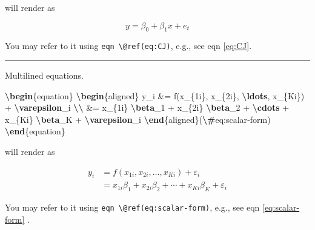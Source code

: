 \documentclass[
]{book}
\newenvironment{Shaded}{\begin{snugshade}}{\end{snugshade}}
\newcommand{\ExtensionTok}[1]{#1}
\newcommand{\KeywordTok}[1]{\textcolor[rgb]{0.13,0.29,0.53}{\textbf{#1}}}
\newcommand{\NormalTok}[1]{#1}
\newcommand{\SpecialCharTok}[1]{\textcolor[rgb]{0.81,0.36,0.00}{\textbf{#1}}}
\newcommand{\SpecialStringTok}[1]{\textcolor[rgb]{0.31,0.60,0.02}{#1}}
\theoremstyle{definition}
\theoremstyle{definition}
\theoremstyle{definition}
\theoremstyle{definition}
\theoremstyle{remark}
\begin{document}
will render as

\begin{equation} 
y=\beta_0 + \beta_1x + e_t
\label{eq:CJ}
\end{equation}

You may refer to it using \texttt{eqn\ \textbackslash{}@ref(eq:CJ)}, e.g., see eqn \eqref{eq:CJ}.

\begin{center}\rule{0.5\linewidth}{0.5pt}\end{center}

\begin{Shaded}
\begin{Highlighting}[]
\NormalTok{Multilined equations.}
  
\KeywordTok{\textbackslash{}begin}\NormalTok{\{}\ExtensionTok{equation}\NormalTok{\}}\SpecialStringTok{ }
\KeywordTok{\textbackslash{}begin}\NormalTok{\{}\ExtensionTok{aligned}\NormalTok{\}}
\SpecialStringTok{y\_i \&= f(x\_\{1i\}, x\_\{2i\}, }\SpecialCharTok{\textbackslash{}ldots}\SpecialStringTok{, x\_\{Ki\}) + }\SpecialCharTok{\textbackslash{}varepsilon}\SpecialStringTok{\_i }\SpecialCharTok{\textbackslash{}\textbackslash{}}
\SpecialStringTok{\&= x\_\{1i\} }\SpecialCharTok{\textbackslash{}beta}\SpecialStringTok{\_1 + x\_\{2i\} }\SpecialCharTok{\textbackslash{}beta}\SpecialStringTok{\_2 + }\SpecialCharTok{\textbackslash{}cdots}\SpecialStringTok{ + x\_\{Ki\} }\SpecialCharTok{\textbackslash{}beta}\SpecialStringTok{\_K + }\SpecialCharTok{\textbackslash{}varepsilon}\SpecialStringTok{\_i}
\KeywordTok{\textbackslash{}end}\NormalTok{\{}\ExtensionTok{aligned}\NormalTok{\}}\SpecialStringTok{(}\SpecialCharTok{\textbackslash{}\#}\SpecialStringTok{eq:scalar{-}form)}
\KeywordTok{\textbackslash{}end}\NormalTok{\{}\ExtensionTok{equation}\NormalTok{\}}
\end{Highlighting}
\end{Shaded}

will render as

\begin{equation} 
\begin{aligned}
y_i &= f(x_{1i}, x_{2i}, \ldots, x_{Ki}) + \varepsilon_i \\
&= x_{1i} \beta_1 + x_{2i} \beta_2 + \cdots + x_{Ki} \beta_K + \varepsilon_i
\end{aligned}\label{eq:scalar-form}
\end{equation}

You may refer to it using \texttt{eqn\ \textbackslash{}@ref(eq:scalar-form)}, e.g., see eqn \eqref{eq:scalar-form} .
\end{document}
